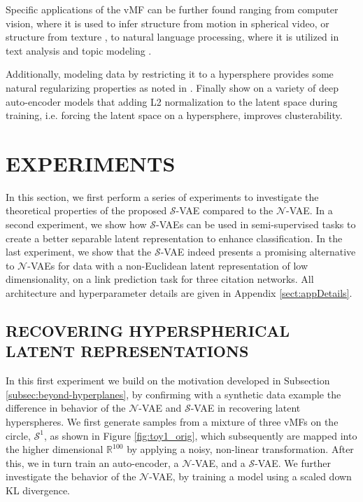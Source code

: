 \documentclass[letterpaper]{article}
\newcommand{\Sv}{$\mathcal{S}$}
\newcommand{\Nv}{$\mathcal{N}$}
\begin{document}
Specific applications of the vMF can be further found ranging from computer vision, where it is used to infer structure from motion \citep{guan2017structure} in spherical video, or structure from texture \citep{wilson2014spherical-texture}, to natural language processing, where it is utilized in text analysis \citep{banerjee2003generative-text, banerjee2005clustering} and topic modeling \citep{banerjee2007topic, reisinger:icml10}. 

Additionally, modeling data by restricting it to a hypersphere provides some natural regularizing properties as noted in \citep{liu-nips17-hypersphere-cnn}. Finally \citet{aytekin2018clustering} show on a variety of deep auto-encoder models that adding L2 normalization to the latent space during training, i.e. forcing the latent space on a hypersphere, improves clusterability.

\section{EXPERIMENTS} \label{sec:exp}

In this section, we first perform a series of experiments to investigate the theoretical properties of the proposed \Sv-VAE compared to the \Nv-VAE. In a second experiment, we show how \Sv-VAEs can be used in semi-supervised tasks to create a better separable latent representation to enhance classification. In the last experiment, we show that the \Sv-VAE indeed presents a promising alternative to \Nv-VAEs for data with a non-Euclidean latent representation of low dimensionality, on a link prediction task for three citation networks. All architecture and hyperparameter details are given in Appendix \ref{sect:appDetails}.

\subsection{RECOVERING HYPERSPHERICAL LATENT REPRESENTATIONS} \label{subsec:exp-recover-latent}

In this first experiment we build on the motivation developed in Subsection \ref{subsec:beyond-hyperplanes}, by confirming with a synthetic data example the difference in behavior of the \Nv-VAE and \Sv-VAE in recovering latent hyperspheres. We first generate samples from a mixture of three vMFs on the circle, $\mathcal{S}^1$, as shown in Figure \ref{fig:toy1_orig}, which subsequently are mapped into the higher dimensional $\mathbb{R}^{100}$ by applying a noisy, non-linear transformation. After this, we in turn train an auto-encoder, a \Nv-VAE, and a \Sv-VAE. We further investigate the behavior of the \Nv-VAE, by training a model using a scaled down KL divergence.
\end{document}
